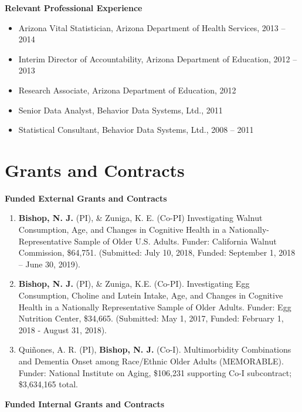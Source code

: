 \documentclass[
]{article}
\begin{document}
\textbf{Relevant Professional Experience}

\begin{itemize}
\item
  Arizona Vital Statistician, Arizona Department of Health Services,
  2013 -- 2014
\item
  Interim Director of Accountability, Arizona Department of Education,
  2012 -- 2013
\item
  Research Associate, Arizona Department of Education, 2012
\item
  Senior Data Analyst, Behavior Data Systems, Ltd., 2011
\item
  Statistical Consultant, Behavior Data Systems, Ltd., 2008 -- 2011
\end{itemize}

\hypertarget{grants-and-contracts}{%
\section{\texorpdfstring{\textbf{Grants and
Contracts}}{Grants and Contracts}}\label{grants-and-contracts}}

\textbf{Funded External Grants and Contracts}

\begin{enumerate}
\def\labelenumi{\arabic{enumi}.}
\item
  \textbf{Bishop, N. J.} (PI), \& Zuniga, K. E. (Co-PI) Investigating
  Walnut Consumption, Age, and Changes in Cognitive Health in a
  Nationally-Representative Sample of Older U.S. Adults. Funder:
  California Walnut Commission, \$64,751. (Submitted: July 10, 2018,
  Funded: September 1, 2018 -- June 30, 2019).
\item
  \textbf{Bishop, N. J.} (PI), \& Zuniga, K.E. (Co-PI). Investigating
  Egg Consumption, Choline and Lutein Intake, Age, and Changes in
  Cognitive Health in a Nationally Representative Sample of Older
  Adults. Funder: Egg Nutrition Center, \$34,665. (Submitted: May 1,
  2017, Funded: February 1, 2018 - August 31, 2018).
\item
  Quiñones, A. R. (PI), \textbf{Bishop, N. J.} (Co-I). Multimorbidity
  Combinations and Dementia Onset among Race/Ethnic Older Adults
  (MEMORABLE). Funder: National Institute on Aging, \$106,231 supporting
  Co-I subcontract; \$3,634,165 total.
\end{enumerate}

\textbf{Funded Internal Grants and Contracts}
\end{document}
